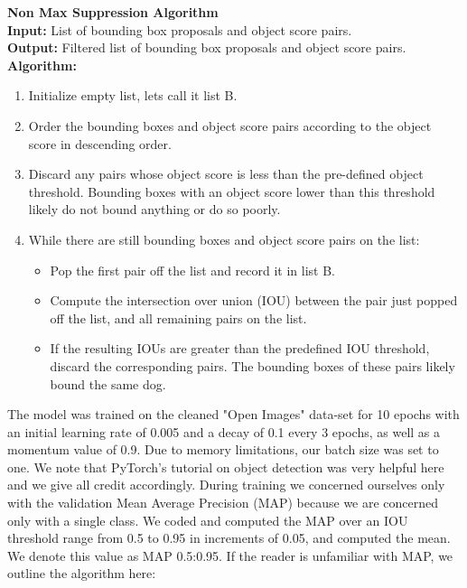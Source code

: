 \documentclass{article}
\begin{document}
\begin{minipage}{1\textwidth}%
	\noindent \textbf{Non Max Suppression Algorithm} \\

  \noindent \textbf{Input:} List of bounding box proposals and object score pairs. \\
  
  \noindent \textbf{Output:} Filtered list of bounding box proposals and object score pairs. \\
  
  \noindent \textbf{Algorithm:} \\
\end{minipage}%

\begin{enumerate}

  \item Initialize empty list, lets call it list B.

  \item Order the bounding boxes and object score pairs according to the object score in descending order.
  
  \item Discard any pairs whose object score is less than the pre-defined object threshold.  Bounding boxes with an object score lower than this threshold likely do not bound anything or do so poorly.
  
  \item While there are still bounding boxes and object score pairs on the list:
        \begin{itemize}
             \item Pop the first pair off the list and record it in list B.            
             \item Compute the intersection over union (IOU) between the pair just popped off the list, and all remaining pairs on the list.
             \item If the resulting IOUs are greater than the predefined IOU threshold, discard the corresponding pairs.  The bounding boxes of these pairs likely bound the same dog.
        \end{itemize}
\end{enumerate}

The model was trained on the cleaned "Open Images" data-set for 10 epochs with an initial learning rate of 0.005 and a decay of 0.1 every 3 epochs, as well as a momentum value of 0.9.  Due to memory limitations, our batch size was set to one.  We note that PyTorch's tutorial on object detection \cite{TorchVision} was very helpful here and we give all credit accordingly.  During training we concerned ourselves only with the validation Mean Average Precision (MAP) because we are concerned only with a single class.  We coded and computed the MAP over an IOU threshold range from 0.5 to 0.95 in increments of 0.05, and computed the mean.  We denote this value as MAP 0.5:0.95.   If the reader is unfamiliar with MAP, we outline the algorithm here:
\end{document}
